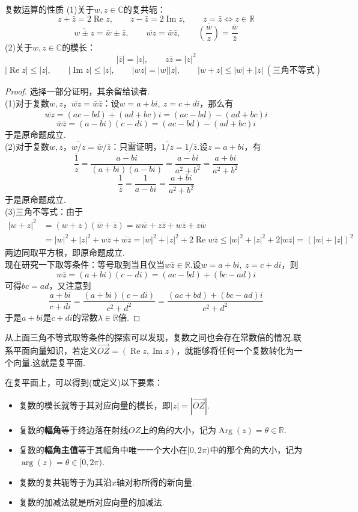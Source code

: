 \documentclass[lang=cn, zihao=5]{elegantbook}
\newcommand{\xl}[1]{\overrightarrow{#1}}
\newcommand{\ssb}[1]{\left( #1 \right)}
\newcommand{\R}{\mathbb{R}}
\newcommand{\C}{\mathbb{C}}
\DeclareMathOperator{\CRe}{Re}
\DeclareMathOperator{\CIm}{Im}
\DeclareMathOperator{\Arg}{Arg}
\begin{document}
\begin{proposition}{复数运算的性质}
	(1)关于$w,z \in \C$的复共轭：
	$$z + \bar{z} = 2\CRe z,\qquad z - \bar{z} = 2\CIm z,\qquad z=\bar{z} \Leftrightarrow z \in \R$$
	$$\overline{w \pm z} = \bar{w} \pm \bar{z},\qquad \overline{wz} = \bar{w} \bar{z},\qquad \overline{\ssb{\frac{w}{z}}} = \frac{\bar{w}}{\bar{z}}$$
	(2)关于$w,z \in \C$的模长：
	$$|\bar{z}| = |z|,\qquad z \bar{z} = |z|^2$$
	$$|\CRe z| \leq |z|,\qquad |\CIm z| \leq |z|,\qquad |wz|=|w||z|,\qquad |w+z| \leq |w|+|z|~(\textit{三角不等式})$$
\end{proposition}
\begin{proof}
	选择一部分证明，其余留给读者. \\
	(1)对于复数$w,z$，$\overline{wz} = \bar{w} \bar{z}$：设$w=a+bi ,~z=c+di$，那么有
	$$\overline{wz} = \overline{(ac-bd)+(ad+bc)i} = (ac-bd)-(ad+bc)i$$
	$$\bar{w} \bar{z} = (a-bi)(c-di) = (ac-bd)-(ad+bc)i$$
	于是原命题成立. \\
	(2)对于复数$w,z$，$\overline{w/z} = \bar{w}/\bar{z}$：只需证明，$\overline{1/z}=1/\bar{z}$.设$z=a+bi$，有
	$$\overline{ \frac{1}{z} } = \overline{ \frac{a-bi}{(a+bi )(a-bi )} } = \overline{ \frac{a-bi }{a^2+b^2} } = \frac{a+bi }{a^2+b^2}$$
	$$\frac{1}{\bar{z}} = \frac{1}{a-bi } = \frac{a+bi }{a^2+b^2}$$
	于是原命题成立. \\
	(3)三角不等式：由于
	\begin{align*}
		|w+z|^2 &= (w+z)(\bar{w}+\bar{z}) = w\bar{w} + z\bar{z} + w\bar{z} + z\bar{w} \\
		&= |w|^2+|z|^2+w\bar{z} + \overline{w\bar{z}} = |w|^2+|z|^2+2\CRe w\bar{z} \leq |w|^2 + |z|^2 + 2|w\bar{z}| = (|w|+|z|)^2
	\end{align*}
	两边同取平方根，即原命题成立. \\
	现在研究一下取等条件：等号取到当且仅当$w\bar{z} \in \R$.设$w=a+bi ,~z=c+di$，则$$w\bar{z} = (a+bi )(c-di ) = (ac-bd) + (bc-ad)i$$
	可得$bc=ad$，又注意到$$\frac{a+bi}{c+di} = \frac{(a+bi )(c-di )}{c^2+d^2} = \frac{(ac+bd) + (bc-ad)i }{c^2+d^2}$$
	于是$a+bi$是$c+di$的常数$\lambda \in \R$倍.
\end{proof}

从上面三角不等式取等条件的探索可以发现，复数之间也会存在常数倍的情况.联系平面向量知识，若定义$\xl{OZ} = (\CRe z,\CIm z)$，就能够将任何一个复数转化为一个向量.这就是复平面.


在复平面上，可以得到(或定义)以下要素：

\begin{itemize}
	\item 复数的模长就等于其对应向量的模长，即$|z|=|\xl{OZ}|$.
	\item 复数的\textbf{幅角}等于终边落在射线$OZ$上的角的大小，记为$\Arg (z)=\theta \in \R$.
	\item 复数的\textbf{幅角主值}等于其幅角中唯一一个大小在$[0,2\pi )$中的那个角的大小，记为$\arg (z) = \theta \in [0,2\pi )$.
	\item 复数的复共轭等于为其沿$x$轴对称所得的新向量.
	\item 复数的加减法就是所对应向量的加减法.
\end{itemize}
\end{document}
